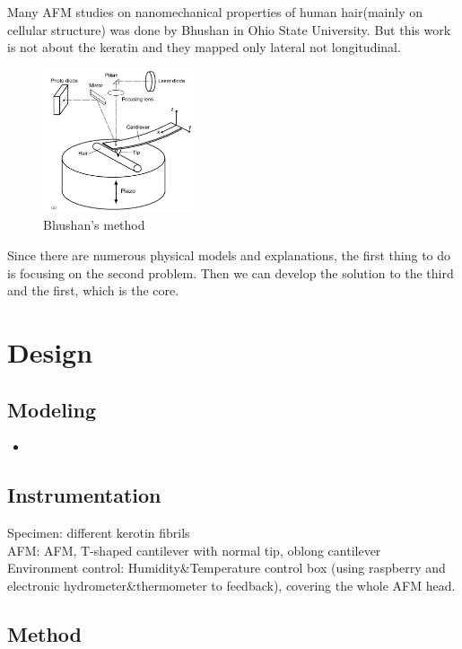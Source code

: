 \documentclass{article}
\begin{document}
Many AFM studies on nanomechanical properties of human hair(mainly on cellular structure) was done by Bhushan in Ohio State University\citep{bhushan2006afm}. But this work is not about the keratin and they mapped only lateral not longitudinal. 
\begin{figure}[H]
    \centering
    \includegraphics[width=0.4\textwidth]{bhushan.png}
    \caption{Bhushan's method}
\end{figure}



Since there are numerous physical models and explanations, the first thing to do is focusing on the second problem. Then we can develop the solution to the third and the first, which is the core.


\section{Design}
\subsection{Modeling}
\begin{itemize}
    \item 
\end{itemize}

\subsection{Instrumentation}
Specimen: different kerotin fibrils\\
AFM: AFM, T-shaped cantilever with normal tip, oblong cantilever\\
Environment control: Humidity\&Temperature control box (using raspberry and electronic hydrometer\&thermometer to feedback), covering the whole AFM head.

\subsection{Method}
\end{document}
